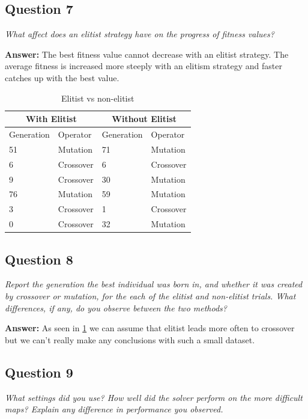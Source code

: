 \documentclass[a4paper]{article}
\begin{document}
\subsection*{Question 7}
\emph{What affect does an elitist strategy have on the progress of fitness values?}

 \textbf{Answer: } The best fitness value cannot decrease with an elitist strategy. The average fitness is increased more steeply with an elitism strategy and faster catches up with the best value. 

\begin{table}[h]
\begin{tabular}{|l|l|l|l|}
\hline
\multicolumn{2}{|c|}{With Elitist} & \multicolumn{2}{c|}{Without Elitist} \\ \hline
Generation       & Operator        & Generation        & Operator         \\ \hline
51               & Mutation        & 71                & Mutation         \\ \hline
6                & Crossover       & 6                 & Crossover        \\ \hline
9                & Crossover       & 30                & Mutation         \\ \hline
76               & Mutation        & 59                & Mutation         \\ \hline
3                & Crossover       & 1                 & Crossover        \\ \hline
0                & Crossover       & 32                & Mutation         \\ \hline
\end{tabular}
\caption{Elitist vs non-elitist}
\label{table:tableElitist}
\end{table}

\subsection*{Question 8}
\emph{Report the generation the best individual was born in, and whether
it was created by crossover or mutation, for the each of the elitist and non-elitist trials. What differences, if any, do you observe between the two methods?}

\textbf{Answer: } As seen in \ref{table:tableElitist} we can assume that elitist leads more often to crossover but we can't really make any conclusions with such a small dataset.
 
\subsection*{Question 9}
\emph{What settings did you use? How well did the solver perform on
the more difficult maps? Explain any difference in performance you observed.}
\end{document}
